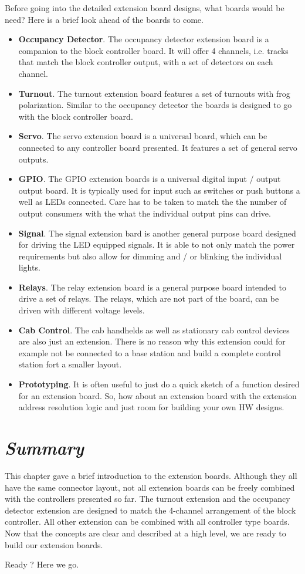 Before going into the detailed extension board designs, what boards would be need? Here is a brief look ahead of the boards to come.
\begin{itemize}
\item \textbf{Occupancy Detector}. The occupancy detector extension board is a companion to the block controller board. It will offer 4 channels, i.e. tracks that match the block controller output, with a set of detectors on each channel.
\item \textbf{Turnout}. The turnout extension board features a set of turnouts with frog polarization. Similar to the occupancy detector the boards is designed to go with the block controller board.
\item \textbf{Servo}. The servo extension board is a universal board, which can be connected to any controller board presented. It features a set of general servo outputs.
\item \textbf{GPIO}. The GPIO extension boards is a universal digital input / output output board. It is typically used for input such as switches or push buttons a well as LEDs connected. Care has to be taken to match the the number of output consumers with the what the individual output pins can drive.
\item \textbf{Signal}. The signal extension bard is another general purpose board designed for driving the LED equipped signals. It is able to not only match the power requirements but also allow for dimming and / or blinking the individual lights.
\item \textbf{Relays}. The relay extension board is a general purpose board intended to drive a set of relays. The relays, which are not part of the board, can be driven with different voltage levels.
\item \textbf{Cab Control}. The cab handhelds as well as stationary cab control devices are also just an extension. There is no reason why this extension could for example not be connected to a base station and build a complete control station fort a smaller layout.
\item \textbf{Prototyping}. It is often useful to just do a quick sketch of a function desired for an extension board. So, how about an extension board with the extension address resolution logic and just room for building your own HW designs.
\end{itemize}

\section{\textit{Summary}}

This chapter gave a brief introduction to the extension boards. Although they all have the same connector layout, not all extension boards can be freely combined with the controllers presented so far. The turnout extension and the occupancy detector extension are designed to match the 4-channel arrangement of the block controller. All other extension can be combined with all controller type boards. Now that the concepts are clear and described at a high level, we are ready to build our extension boards.

Ready ? Here we go.